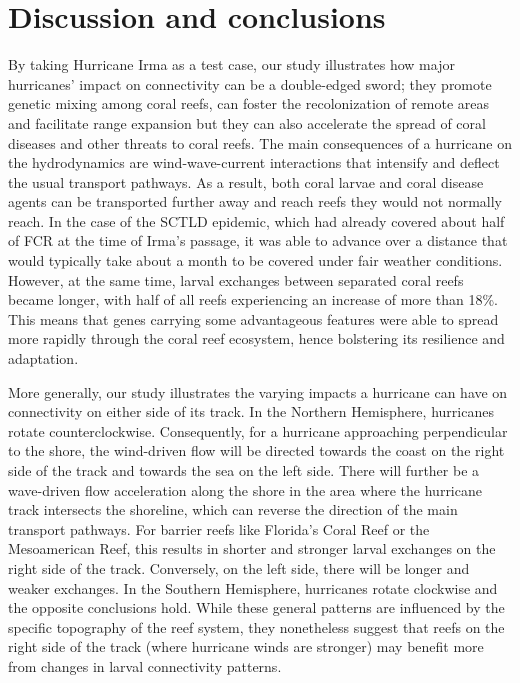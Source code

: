 \documentclass[fleqn,10pt]{wlscirep}
\begin{document}
\section{Discussion and conclusions}

By taking Hurricane Irma as a test case, our study illustrates how major hurricanes' impact on connectivity can be a double-edged sword; they promote genetic mixing among coral reefs, can foster the recolonization of remote areas and facilitate range expansion but they can also accelerate the spread of coral diseases and other threats to coral reefs. The main consequences of a hurricane on the hydrodynamics are wind-wave-current interactions that intensify and deflect the usual transport pathways. As a result, both coral larvae and coral disease agents can be transported further away and reach reefs they would not normally reach. In the case of the SCTLD epidemic, which had already covered about half of FCR at the time of Irma's passage, it was able to advance over a distance that would typically take about a month to be covered under fair weather conditions. However, at the same time, larval exchanges between separated coral reefs became longer, with half of all reefs experiencing an increase of more than 18\%. This means that genes carrying some advantageous features were able to spread more rapidly through the coral reef ecosystem, hence bolstering its resilience and adaptation.

More generally, our study illustrates the varying impacts a hurricane can have on connectivity on either side of its track. In the Northern Hemisphere, hurricanes rotate counterclockwise. Consequently, for a hurricane approaching perpendicular to the shore, the wind-driven flow will be directed towards the coast on the right side of the track and towards the sea on the left side. There will further be a wave-driven flow acceleration along the shore in the area where the hurricane track intersects the shoreline, which can reverse the direction of the main transport pathways. For barrier reefs like Florida's Coral Reef or the Mesoamerican Reef, this results in shorter and stronger larval exchanges on the right side of the track. Conversely, on the left side, there will be longer and weaker exchanges. In the Southern Hemisphere, hurricanes rotate clockwise and the opposite conclusions hold. While these general patterns are influenced by the specific topography of the reef system, they nonetheless suggest that reefs on the right side of the track (where hurricane winds are stronger) may benefit more from changes in larval connectivity patterns.
\end{document}
